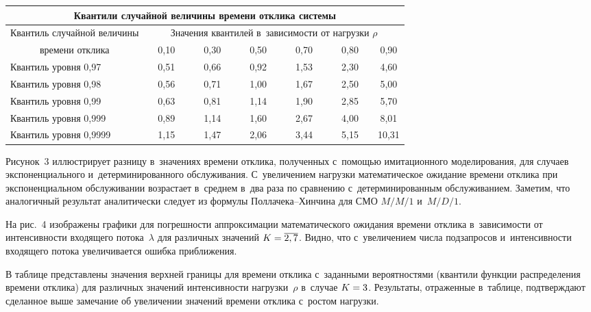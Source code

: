 \begin{multicols}{2}
\begin{table*}\small
  \begin{center}
  \begin{tabular}{|l|c|c|c|c|c|c|}
  \multicolumn{7}{c}{Квантили случайной величины времени отклика системы}\\[6pt]
   \hline
  \multicolumn{1}{|c|}{Квантиль случайной величины} &\multicolumn{6}{c|}{Значения 
квантилей в~зависимости от нагрузки $\rho$}\\
\cline{2-7}
  \multicolumn{1}{|c|}{времени отклика}&\ \ 0,10\ \  &\ \  0,30\ \  &\ \  0,50\ \  &
  \ \  0,70\ \  &\ \  0,80\ \  &0,90\\
\hline
Квантиль уровня 0,97&0,51&0,66&0,92&1,53&2,30&4,60\\
Квантиль уровня 0,98&0,56&0,71&1,00&1,67&2,50&5,00\\
Квантиль уровня 0,99&0,63&0,81&1,14&1,90&2,85&5,70\\
Квантиль уровня 0,999&0,89&1,14&1,60&2,67&4,00&8,01\\
Квантиль уровня 0,9999&1,15&1,47&2,06&3,44&5,15& 10,31\hphantom{9}\\
\hline
\end{tabular}
\end{center}
\vspace*{4pt}
\end{table*}
 

  Рисунок~3 иллюстрирует разницу в~значениях времени отклика, полученных 
с~по\-мощью имитационного моделирования, для случаев экспоненциального 
и~детерминированного обслуживания. С~увеличением нагрузки математическое 
ожидание времени отклика при экспоненциальном обслуживании возрастает 
в~среднем в~два раза по сравнению с~детерминированным обслуживанием. 
Заметим, что аналогичный результат аналитически следует из формулы  
Пол\-ла\-че\-ка--Хин\-чи\-на для СМО $M/M/1$ и~$M/D/1$.
   
   
  
  На рис.~4 изображены графики для погрешности аппроксимации 
математического ожидания времени отклика в~зависимости от интенсивности 
входящего потока~$\lambda$ для различных значений $K\hm= \overline{2,7}$. 
Видно, что с~увеличением числа подзапросов и~интенсивности входящего 
потока увеличивается ошибка приближения.
  
  
  
  В таблице представлены значения верхней границы для времени отклика 
  с~заданными вероятностями (квантили функции распределения времени отклика) 
для различных значений интенсивности нагрузки~$\rho$ в~случае $K\hm=3$. 
Результаты, отраженные в~таблице, подтверждают сделанное выше замечание 
об увеличении значений времени отклика с~ростом нагрузки.


\end{multicols}
